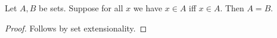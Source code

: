 \begin{proposition}\label{mismatched_pointwise_set_extensionality}
    Let $A,B$ be sets.
    Suppose for all $x$ we have $x\in A$ iff $x\in A$.
    Then $A=B$.
\end{proposition}
\begin{proof}
    Follows by set extensionality.
\end{proof}
